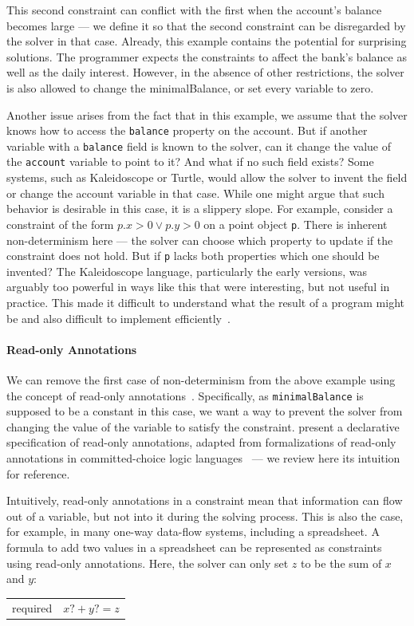 This second constraint can conflict with the first when the account's
balance becomes large --- we define it so that the second constraint can
be disregarded by the solver in that case. Already, this example
contains the potential for surprising solutions. The programmer
expects the constraints to affect the bank's balance as well as the
daily interest.  However, in the absence of other restrictions, the
solver is also allowed to change the minimalBalance, or set every
variable to zero.

Another issue arises from the fact that in this example, we assume
that the solver knows how to access the \lstinline!balance! property
on the account. But if another variable with a \lstinline!balance!
field is known to the solver, can it change the value of the
\lstinline!account! variable to point to it? And what if no such field
exists? Some systems, such as Kaleidoscope or Turtle, would allow the
solver to invent the field or change the account variable in that
case. While one might argue that such behavior is desirable in this
case, it is a slippery slope.  For example, consider a constraint of
the form $p.x > 0 \vee p.y > 0$ on a point object \verb!p!.  There is
inherent non-determinism here --- the solver can choose which property
to update if the constraint does not hold.  But if \verb!p!  lacks
both properties which one should be invented? The Kaleidoscope
language, particularly the early versions, was arguably too powerful
in ways like this that were interesting, but not useful in
practice. This made it difficult to understand what the result of a
program might be and also difficult to implement
efficiently~\cite{lopez-oopsla-1994}.

\paragraph{Read-only Annotations}
We can remove the first case of non-determinism from the above example
using the concept of read-only
annotations~\cite{borning1992constraint}. Specifically,
as \lstinline!minimalBalance! is supposed to be a constant in this
case, we want a way to prevent the solver from changing the value of
the variable to satisfy the
constraint. \citeauthor{borning1992constraint}
present a declarative specification of read-only annotations, adapted
from formalizations of read-only annotations in committed-choice logic
languages~\cite{maher-iclp-1987} --- we review here its intuition for
reference.

Intuitively, read-only annotations in a constraint mean that
information can flow out of a variable, but not into it during the
solving process. This is also the case, for example, in many one-way
data-flow systems, including a spreadsheet. A formula to add two
values in a spreadsheet can be represented as constraints using
read-only annotations. Here, the solver can only set $z$ to be the sum
of $x$ and $y$:
\begin{center}
\begin{tabular}{rl}
required &     $x?+y?=z$ \\
\end{tabular}
\end{center}

